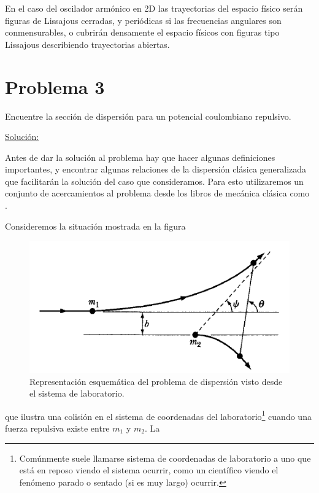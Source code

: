 \documentclass[a4paper,10pt]{article}
\numberwithin{equation}{section}
\begin{document}
\vspace{.3cm}

En el caso del oscilador armónico en 2D las trayectorias del espacio físico
serán figuras de Lissajous cerradas, y periódicas si las frecuencias angulares
son conmensurables, o cubrirán densamente el espacio físicos con figuras
tipo Lissajous describiendo trayectorias abiertas.

\section{Problema 3}

Encuentre la sección de dispersión para un potencial coulombiano repulsivo.

\vspace{.3cm}

\underline{Solución:} \vspace{.3cm}

Antes de dar la solución al problema hay que hacer algunas definiciones importantes, y
encontrar algunas relaciones de la dispersión clásica generalizada que facilitarán
la solución del caso que consideramos. Para esto utilizaremos un conjunto de 
acercamientos al problema desde los libros de mecánica clásica como
\cite{marion, goldstein}.

\vspace{.3cm}

Consideremos la situación mostrada en la figura 

\begin{figure}[H]
 \center
 \includegraphics[scale=0.5]{problema3fig1}
 \caption{Representación esquemática del problema de dispersión visto desde 
 el sistema de laboratorio.}
 \label{fig:problema3fig1}
\end{figure}

que ilustra una colisión en el sistema de coordenadas del laboratorio\footnote{Comúnmente 
suele llamarse sistema de coordenadas de laboratorio a uno que está en reposo
viendo el sistema ocurrir, como un científico viendo el fenómeno parado 
o sentado (si es muy largo) ocurrir.} cuando una fuerza repulsiva existe 
entre $m_1$ y $m_2$. La 
\end{document}
